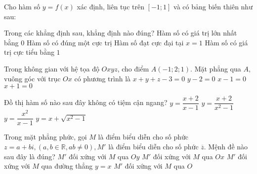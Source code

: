 \begin{ex}%
\begin{center}
 Cho hàm số $y=f(x)$ xác định, liên tục trên $[-1;1]$ và có bảng biến thiên như sau:
 \end{center} 
Trong các khẳng định sau, khẳng định nào đúng?
\choice 
{Hàm số có giá trị lớn nhất bằng $0$}
{\True Hàm số có đúng một cực trị}
{Hàm số đạt cực đại tại $x=1$}
{Hàm số có giá trị cực tiểu bằng $1$}
\end{ex} 

\begin{ex}%
Trong không gian với hệ tọa độ $Oxyz$, cho điểm $A(-1;2;1)$. Mặt phẳng qua $A$, vuông góc với trục $Ox$ có phương trình là
\choice 
{$x+y+z-3=0$}
{$y-2=0$}
{$x-1=0$}
{\True $x+1=0$}  
\end{ex} 

\begin{ex}%
Đồ thị hàm số nào sau đây không có tiệm cận ngang?
\choice 
{$y=\dfrac{x+2}{x-1}$}
{$y=\dfrac{x+2}{x^2-1}$}
{\True $y=\dfrac{x^2}{x-1}$}
{$y=x+\sqrt{x^2-1}$}  
\end{ex} 

\begin{ex}%
Trong mặt phẳng phức, gọi $M$ là điểm biểu diễn cho số phức $z=a+bi, (a, b \in \mathbb{R}, ab \ne 0), M'$ là điểm biểu diễn cho số phức $\overline{z}$. Mệnh đề nào sau đây là đúng?
\choice 
{$M'$ đối xứng với $M$ qua $Oy$}
{\True $M'$ đối xứng với $M$ qua $Ox$}
{$M'$ đối xứng với $M$ qua đường thẳng $y=x$}
{$M'$ đối xứng với $M$ qua $O$}  
\end{ex} 

